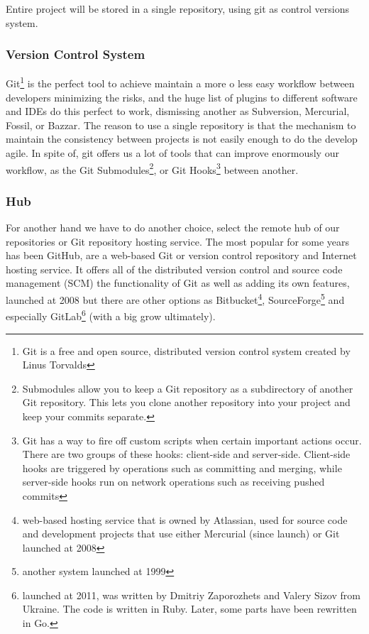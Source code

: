 Entire project will be stored in a single repository, using git as control
versions system.

\subsubsection{Version Control System}

Git\footnote{Git is a free and open source, distributed version control system
created by Linus Torvalds} is the perfect tool to achieve maintain a more o
less easy workflow between developers minimizing the risks, and the huge list of
plugins to different software and IDEs do this perfect to work, dismissing another
as Subversion, Mercurial, Fossil, or Bazzar.
\intro
The reason to use a single repository is that the mechanism to maintain the
consistency between projects is not easily enough to do the develop agile.
In spite of, git offers us a lot of tools that can improve enormously our
workflow, as the Git Submodules\footnote{Submodules allow you to keep a
Git repository as a subdirectory of another Git repository.
This lets you clone another repository into your project and keep your commits
separate.}, or Git Hooks\footnote{Git has a way to fire off custom scripts when
certain important actions occur. There are two groups of these hooks:
client-side and server-side. Client-side hooks are triggered by operations such
as committing and merging, while server-side hooks run on network operations
such as receiving pushed commits} between another.

\subsubsection{Hub}

For another hand we have to do another choice, select the remote hub of our repositories
or Git repository hosting service. The most popular for some years has been GitHub,
are a web-based Git or version control repository and Internet hosting service.
It offers all of the distributed version control and source code management (SCM)
the functionality of Git as well as adding its own features,
launched at 2008
but there are other options as Bitbucket\footnote{web-based hosting service
that is owned by Atlassian, used for source code and development projects that
use either Mercurial (since launch) or Git
launched at 2008},
SourceForge\footnote{another system launched at 1999} and especially
GitLab\footnote{launched at 2011, was written by Dmitriy Zaporozhets and Valery
Sizov from Ukraine. The code is written in Ruby. Later, some parts have been
rewritten in Go.} (with a big grow ultimately).


